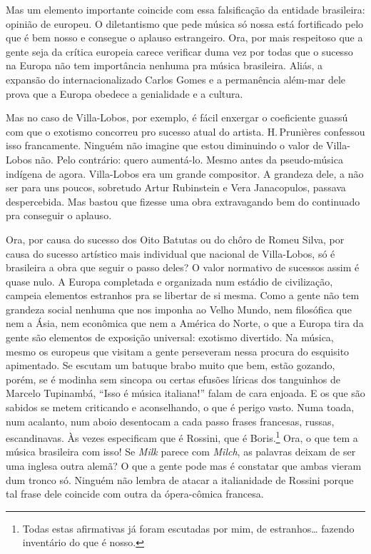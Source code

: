 Mas um elemento importante coincide com essa falsificação da entidade
brasileira: opinião de europeu. O diletantismo que pede música só nossa
está fortificado pelo que é bem nosso e consegue o aplauso
estrangeiro. Ora, por mais respeitoso que a gente seja da crítica
europeia carece verificar duma vez por todas que o sucesso na Europa não
tem importância nenhuma pra música brasileira. Aliás, a expansão do
internacionalizado Carlos Gomes e a permanência além-mar dele prova que
a Europa obedece a genialidade e a cultura.

Mas no caso de Villa-Lobos, por exemplo, é fácil enxergar o coeficiente
guassú com que o exotismo concorreu pro sucesso atual do artista. H.\,Prunières confessou isso francamente. Ninguém não imagine que estou
diminuindo o valor de Villa-Lobos não. Pelo contrário: quero aumentá-lo.
Mesmo antes da pseudo-música indígena de agora. Villa-Lobos era um
grande compositor. A grandeza dele, a não ser para uns poucos, sobretudo
Artur Rubinstein e Vera Janacopulos, passava despercebida. Mas bastou
que fizesse uma obra extravagando bem do continuado pra conseguir o
aplauso.

Ora, por causa do sucesso dos Oito Batutas ou do chôro de Romeu Silva,
por causa do sucesso artístico mais individual que nacional de
Villa-Lobos, só é brasileira a obra que seguir o passo deles? O valor
normativo de sucessos assim é quase nulo. A Europa completada e
organizada num estádio de civilização, campeia elementos estranhos pra
se libertar de si mesma. Como a gente não tem grandeza social nenhuma
que nos imponha ao Velho Mundo, nem filosófica que nem a Ásia, nem
econômica que nem a América do Norte, o que a Europa tira da gente são
elementos de exposição universal: exotismo divertido. Na música, mesmo
os europeus que visitam a gente perseveram nessa procura do esquisito
apimentado. Se escutam um batuque brabo muito que bem, estão gozando,
porém, se é modinha sem sincopa ou certas efusões líricas dos tanguinhos
de Marcelo Tupinambá, ``Isso é música italiana!'' falam de cara
enjoada. E os que são sabidos se metem criticando e aconselhando, o que
é perigo vasto. Numa toada, num acalanto, num aboio desentocam a cada
passo frases francesas, russas, escandinavas. Às vezes especificam que é
Rossini, que é Boris.\footnote{Todas estas afirmativas já foram escutadas por mim, de estranhos\ldots{} fazendo inventário do que é nosso.} Ora, o que tem a música brasileira com isso!
Se \textit{Milk} parece com \textit{Milch}, as palavras deixam de ser uma
inglesa outra alemã? O que a gente pode mas é constatar que ambas vieram
dum tronco só. Ninguém não lembra de atacar a italianidade de Rossini
porque tal frase dele coincide com outra da ópera-cômica francesa.

